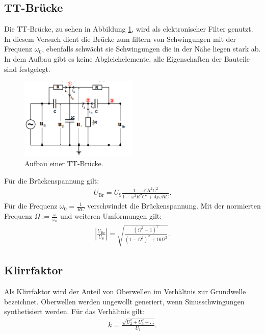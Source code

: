 \subsection{TT-Brücke}
Die TT-Brücke, zu sehen in Abbildung \ref{fig:tt}, wird als elektronischer Filter genutzt.
In diesem Versuch dient die Brücke zum filtern von Schwingungen mit der Frequenz $\omega_0$, ebenfalls schwächt sie Schwingungen die in der Nähe liegen stark ab.
In dem Aufbau gibt es keine Abgleichelemente, alle Eigenschaften der Bauteile sind festgelegt.
\begin{figure}
 \centering
 \includegraphics[width=0.5\textwidth]{tt.PNG}
 \caption{Aufbau einer TT-Brücke.\cite{sample}}
 \label{fig:tt}
 \end{figure}
Für die Brückenspannung gilt:
\begin{align}
  U_\mathrm{Br}=U_\mathrm{S}\frac{1-\omega^2 R^2 C^2}{1-\omega^2 R^2 C^2 + 4j \omega R C}\label{eqn:ubr}.
\end{align}
Für die Frequenz $\omega_0=\frac{1}{RC}$ verschwindet die Brückenspannung.
Mit der normierten Frequenz $\Omega:=\frac{\omega}{\omega_0}$ und weiteren Umformungen gilt:
\begin{align}
  \left|\frac{U_\mathrm{Br}}{U_\mathrm{S}}\right|=\sqrt{\frac{\left(\Omega^2-1\right)^2}{\left(1-\Omega^2\right)^2+16\Omega^2}}\label{eqn:TT}.
\end{align}
\subsection{Klirrfaktor}
Als Klirrfaktor wird der Anteil von Oberwellen im Verhältnis zur Grundwelle bezeichnet. Oberwellen werden ungewollt generiert, wenn Sinusschwingungen synthetisiert werden.
Für das Verhältnis gilt:
\begin{align}
  k=\frac{\sqrt{U_2^2+U_3^2+...}}{U_1}\label{eqn:klirr}.
\end{align}
